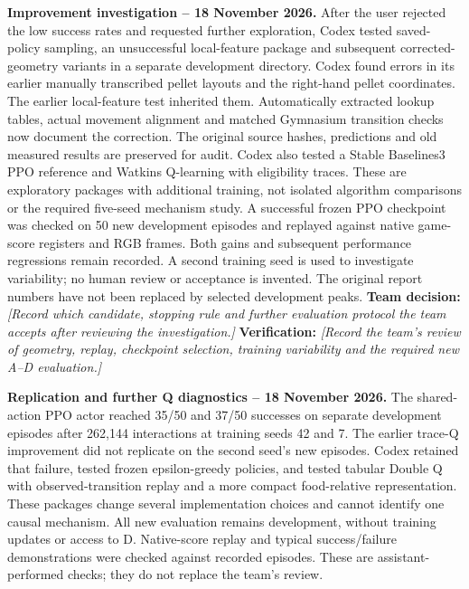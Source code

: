 \medskip
\noindent\textbf{Improvement investigation -- 18 November 2026.}
After the user rejected the low success rates and requested further exploration,
Codex tested saved-policy sampling, an unsuccessful local-feature package and
subsequent corrected-geometry variants in a separate development directory.
Codex found errors in its earlier manually transcribed pellet layouts and the
right-hand pellet coordinates. The earlier local-feature test inherited them.
Automatically extracted lookup tables, actual movement alignment and matched
Gymnasium transition checks now document the correction. The original source
hashes, predictions and old measured results are preserved for audit.
Codex also tested a Stable Baselines3 PPO reference and Watkins Q-learning with
eligibility traces. These are exploratory packages with additional training,
not isolated algorithm comparisons or the required five-seed mechanism study.
A successful frozen PPO checkpoint was checked on 50 new development episodes
and replayed against native game-score registers and RGB frames. Both gains
and subsequent performance regressions remain recorded. A second training seed
is used to investigate variability; no human review or acceptance is invented.
The original report numbers have not been replaced by selected development peaks.
\textbf{Team decision:} \textit{[Record which candidate, stopping rule and further
evaluation protocol the team accepts after reviewing the investigation.]}
\textbf{Verification:} \textit{[Record the team's review of geometry, replay,
checkpoint selection, training variability and the required new A--D evaluation.]}

\medskip
\noindent\textbf{Replication and further Q diagnostics -- 18 November 2026.}
The shared-action PPO actor reached 35/50 and 37/50 successes on separate
development episodes after 262,144 interactions at training seeds 42 and 7.
The earlier trace-Q improvement did not replicate on the second seed's new
episodes. Codex retained that failure, tested frozen epsilon-greedy policies,
and tested tabular Double Q with observed-transition replay and a more compact
food-relative representation. These packages change several implementation
choices and cannot identify one causal mechanism. All new evaluation remains
development, without training updates or access to D. Native-score replay and
typical success/failure demonstrations were checked against recorded episodes.
These are assistant-performed checks; they do not replace the team's review.

